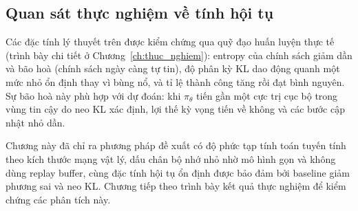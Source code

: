 \documentclass[../DoAn.tex]{subfiles}
\begin{document}
\subsection{Quan sát thực nghiệm về tính hội tụ}
\label{subsec:conv-empirical}

Các đặc tính lý thuyết trên được kiểm chứng qua quỹ đạo huấn luyện thực tế (trình bày chi tiết ở Chương~\ref{ch:thuc_nghiem}): entropy của chính sách giảm dần và bão hoà (chính sách ngày càng tự tin), độ phân kỳ KL dao động quanh một mức nhỏ ổn định thay vì bùng nổ, và tỉ lệ thành công tăng rồi đạt bình nguyên. Sự bão hoà này phù hợp với dự đoán: khi $\pi_\theta$ tiến gần một cực trị cục bộ trong vùng tin cậy do neo KL xác định, lợi thế kỳ vọng tiến về không và các bước cập nhật nhỏ dần.

Chương này đã chỉ ra phương pháp đề xuất có độ phức tạp tính toán tuyến tính theo kích thước mạng vật lý, dấu chân bộ nhớ nhỏ nhờ mô hình gọn và không dùng replay buffer, cùng đặc tính hội tụ ổn định được bảo đảm bởi baseline giảm phương sai và neo KL. Chương tiếp theo trình bày kết quả thực nghiệm để kiểm chứng các phân tích này.
\end{document}
